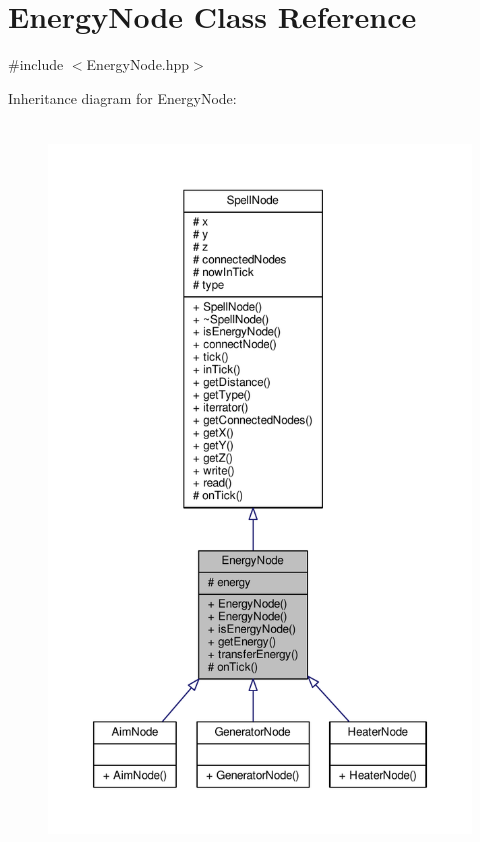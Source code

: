 \hypertarget{class_energy_node}{\section{Energy\-Node Class Reference}
\label{class_energy_node}
}


{\ttfamily \#include $<$Energy\-Node.\-hpp$>$}



Inheritance diagram for Energy\-Node\-:
\nopagebreak
\begin{figure}[H]
\begin{center}
\leavevmode
\includegraphics[height=550pt]{class_energy_node__inherit__graph}
\end{center}
\end{figure}


